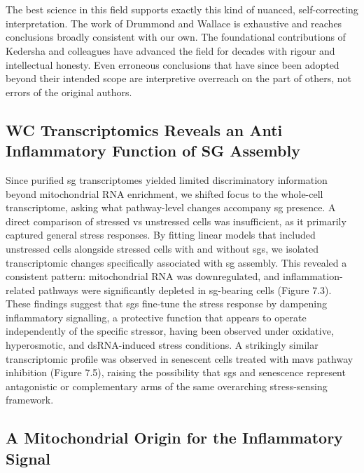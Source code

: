 \\
\\
The best science in this field supports exactly this kind of nuanced, self-correcting interpretation. The work of Drummond and Wallace\cite{glauninger_transcriptome-wide_2025} is exhaustive and reaches conclusions broadly consistent with our own. The foundational contributions of Kedersha and colleagues have advanced the field for decades with rigour and intellectual honesty. Even erroneous conclusions that have since been adopted beyond their intended scope are interpretive overreach on the part of others, not errors of the original authors.

\subsection{WC Transcriptomics Reveals an Anti Inflammatory Function of SG Assembly}

Since purified \gls{sg} transcriptomes yielded limited discriminatory information beyond mitochondrial RNA enrichment, we shifted focus to the whole-cell transcriptome, asking what pathway-level changes accompany \gls{sg} presence. A direct comparison of stressed \gls{vs} unstressed cells was insufficient, as it primarily captured general stress responses. By fitting linear models that included unstressed cells alongside stressed cells with and without \gls{sg}s, we isolated transcriptomic changes specifically associated with \gls{sg} assembly. This revealed a consistent pattern: mitochondrial RNA was downregulated, and inflammation-related pathways were significantly depleted in \gls{sg}-bearing cells (Figure 7.3). These findings suggest that \gls{sg}s fine-tune the stress response by dampening inflammatory signalling, a protective function that appears to operate independently of the specific stressor, having been observed under oxidative, hyperosmotic, and dsRNA-induced stress conditions. A strikingly similar transcriptomic profile was observed in senescent cells treated with \gls{mavs} pathway inhibition\cite{lopez-polo_release_2024} (Figure 7.5), raising the possibility that \gls{sg}s and senescence represent antagonistic or complementary arms of the same overarching stress-sensing framework.

\subsection{A Mitochondrial Origin for the Inflammatory Signal}

